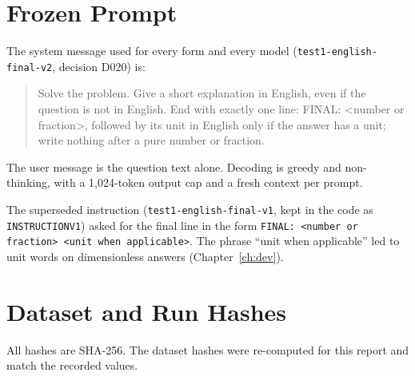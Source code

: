 \documentclass[12pt,a4paper,oneside]{report}
\renewcommand{\_}{\oldunderscore\allowbreak}
\begin{document}
\cleardoublepage
{}
{}
\renewcommand{\bibname}{References}



\appendix

\chapter{Frozen Prompt}
\label{app:prompt}

The system message used for every form and every model (\texttt{test1-english-final-v2}, decision D020) is:

\begin{quote}\small\ttfamily\raggedright
Solve the problem. Give a short explanation in English, even if the question is not in English. End with exactly one line: FINAL: <number or fraction>, followed by its unit in English only if the answer has a unit; write nothing after a pure number or fraction.
\end{quote}

The user message is the question text alone. Decoding is greedy and non-thinking, with a 1,024-token output cap and a fresh context per prompt.

The superseded instruction (\texttt{test1-english-final-v1}, kept in the code as \texttt{INSTRUCTION\_V1}) asked for the final line in the form \texttt{FINAL: <number or fraction> <unit when applicable>}. The phrase ``unit when applicable'' led to unit words on dimensionless answers (Chapter~\ref{ch:dev}).

\chapter{Dataset and Run Hashes}
\label{app:hashes}

All hashes are SHA-256. The dataset hashes were re-computed for this report and match the recorded values.
\end{document}
